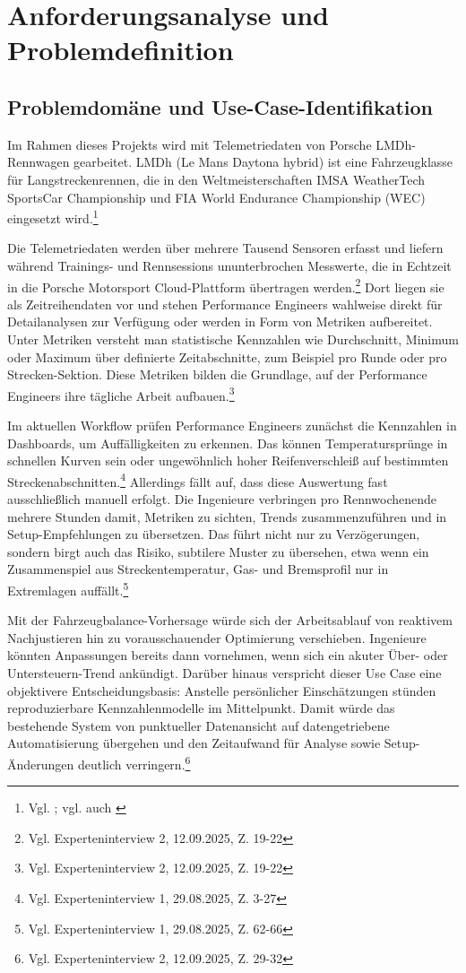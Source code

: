 \chapter{Anforderungsanalyse und Problemdefinition}

\section{Problemdomäne und Use-Case-Identifikation}

Im Rahmen dieses Projekts wird mit Telemetriedaten von Porsche LMDh-Rennwagen 
gearbeitet. LMDh (Le Mans Daytona hybrid) ist eine Fahrzeugklasse für 
Langstreckenrennen, die in den Weltmeisterschaften IMSA WeatherTech SportsCar 
Championship und FIA World Endurance Championship (WEC) eingesetzt wird.\footnote{Vgl. 
\cite{Porsche2023LMDh}; vgl. auch \cite{24hLeMans2025Classes}}

Die Telemetriedaten werden über mehrere Tausend Sensoren erfasst und liefern 
während Trainings- und Rennsessions ununterbrochen Messwerte, die in Echtzeit 
in die Porsche Motorsport Cloud-Plattform übertragen werden.\footnote{Vgl. 
Experteninterview 2, 12.09.2025, Z. 19-22}
Dort liegen sie als Zeitreihendaten vor und stehen Performance Engineers wahlweise direkt für Detailanalysen zur Verfügung oder werden in Form von Metriken aufbereitet. Unter Metriken versteht man statistische Kennzahlen wie Durchschnitt, Minimum oder Maximum über definierte Zeitabschnitte, zum Beispiel pro Runde oder pro Strecken-Sektion. Diese Metriken bilden die Grundlage, auf der Performance Engineers ihre tägliche Arbeit aufbauen.\footnote{Vgl. Experteninterview 2, 12.09.2025, Z. 19-22}

Im aktuellen Workflow prüfen Performance Engineers zunächst die Kennzahlen in Dashboards, um Auffälligkeiten zu erkennen. Das können Temperatursprünge in schnellen Kurven sein oder ungewöhnlich hoher Reifenverschleiß auf bestimmten Streckenabschnitten.\footnote{Vgl. Experteninterview 1, 29.08.2025, Z. 3-27} Allerdings fällt auf, dass diese Auswertung fast ausschließlich manuell erfolgt. Die Ingenieure verbringen pro Rennwochenende mehrere Stunden damit, Metriken zu sichten, Trends zusammenzuführen und in Setup-Empfehlungen zu übersetzen. Das führt nicht nur zu Verzögerungen, sondern birgt auch das Risiko, subtilere Muster zu übersehen, etwa wenn ein Zusammenspiel aus Streckentemperatur, Gas- und Bremsprofil nur in Extremlagen auffällt.\footnote{Vgl. Experteninterview 1, 29.08.2025, Z. 62-66}

Mit der Fahrzeugbalance-Vorhersage würde sich der Arbeitsablauf von reaktivem Nachjustieren hin zu vorausschauender Optimierung verschieben. Ingenieure könnten Anpassungen bereits dann vornehmen, wenn sich ein akuter Über- oder Untersteuern-Trend ankündigt. Darüber hinaus verspricht dieser Use Case eine objektivere Entscheidungsbasis: Anstelle persönlicher Einschätzungen stünden reproduzierbare Kennzahlenmodelle im Mittelpunkt. Damit würde das bestehende System von punktueller Datenansicht auf datengetriebene Automatisierung übergehen und den Zeitaufwand für Analyse sowie Setup-Änderungen deutlich verringern.\footnote{Vgl. Experteninterview 2, 12.09.2025, Z. 29-32}



